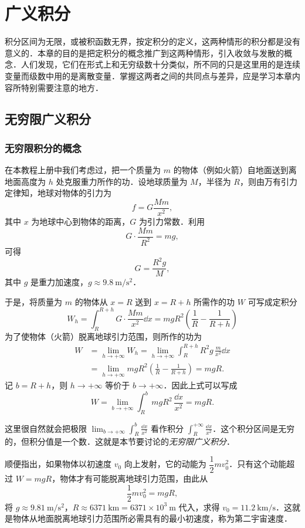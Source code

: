 \chapter{广义积分}

积分区间为无限，或被积函数无界，按定积分的定义，这两种情形的积分都是没有意义的．本章的目的是把定积分的概念推广到这两种情形，引入收敛与发散的概念．人们发现，它们在形式上和无穷级数十分类似，所不同的只是这里用的是连续变量而级数中用的是离散变量．掌握这两者之间的共同点与差异，应是学习本章内容所特别需要注意的地方．

\section{无穷限广义积分}

\subsection{无穷限积分的概念}

在本教程上册中我们考虑过，把一个质量为 $m$ 的物体（例如火箭）自地面送到离地面高度为 $h$ 处克服重力所作的功．设地球质量为 $M$，半径为 $R$，则由万有引力定律知，地球对物体的引力为
\[
f=G\frac{Mm}{x^{2}},
\]
其中 $x$ 为地球中心到物体的距离，$G$ 为引力常数．利用
\[
G\cdot\frac{Mm}{R^{2}}=mg,
\]
可得
\[
G=\frac{R^{2}g}{M},
\]
其中 $g$ 是重力加速度，$g\approx 9.8\ \mathrm{m}/\mathrm{s}^{2}$．

于是，将质量为 $m$ 的物体从 $x=R$ 送到 $x=R+h$ 所需作的功 $W$ 可写成定积分
\[
W_{h}=\int_{R}^{R+h}G\cdot\frac{Mm}{x^{2}}\dd x=mgR^{2}\left(\frac{1}{R}-\frac{1}{R+h}\right)
\]
为了使物体（火箭）脱离地球引力范围，则所作的功为
\[
\begin{aligned}
W&=\lim_{h\to+\infty}W_{h}=\lim_{h\to+\infty}\int_{R}^{R+h}R^{2}g\,\frac{m}{x^{2}}\dd x\\
&=\lim_{h\to+\infty}mgR^{2}\left(\frac{1}{R}-\frac{1}{R+h}\right)=mgR.
\end{aligned}
\]
记 $b=R+h$，则 $h\to+\infty$ 等价于 $b\to+\infty$．因此上式可以写成
\[
W=\lim_{b\to+\infty}\int_{R}^{b}mgR^{2}\,\frac{\dd x}{x^{2}}=mgR.
\]

这里很自然就会把极限 $\displaystyle\lim_{b\to+\infty}\int_{R}^{b}\frac{\dd x}{x^{2}}$ 看作积分 $\displaystyle\int_{R}^{+\infty}\frac{\dd x}{x^{2}}$．这个积分区间是无穷的，但积分值是一个数．这就是本节要讨论的\emph{无穷限广义积分}．

顺便指出，如果物体以初速度 $v_{0}$ 向上发射，它的动能为 $\dfrac{1}{2}mv_{0}^{2}$．只有这个动能超过 $W=mgR$，物体才有可能脱离地球引力范围，由此从
\[
\frac{1}{2}mv_{0}^{2}=mgR,
\]
将 $g\approx 9.81\ \mathrm{m}/\mathrm{s}^{2}$，$R\approx 6371\ \mathrm{km}=6371\times 10^{3}\ \mathrm{m}$ 代入，求得 $v_{0}=11.2\ \mathrm{km}/\mathrm{s}$．这就是物体从地面脱离地球引力范围所必需具有的最小初速度，称为第二宇宙速度．

